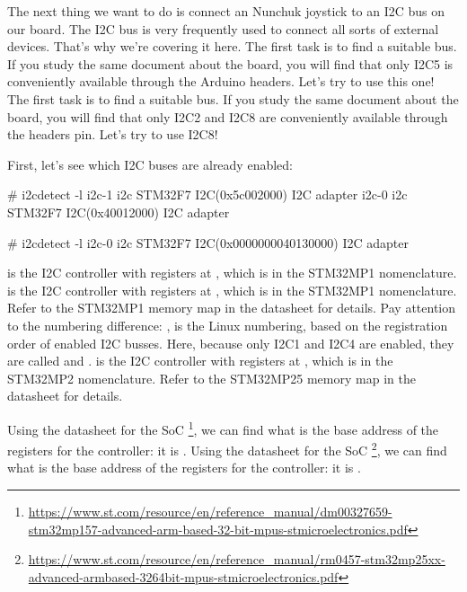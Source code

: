 The next thing we want to do is connect an Nunchuk joystick
to an I2C bus on our board. The I2C bus is very frequently used
to connect all sorts of external devices. That's why we're covering
it here.
\if{}
      The first task is to find a suitable bus. If you study the
      same document about the board, you will find that only I2C5 is
      conveniently available through the Arduino headers. Let's try
      to use this one!
\fi
\if{}
      The first task is to find a suitable bus. If you study the
      same document about the board, you will find that only I2C2 and I2C8 are
      conveniently available through the headers pin. Let's try
      to use I2C8!
\fi

First, let's see which I2C buses are already enabled:

\if{}
      \begin{bashinput}
      # i2cdetect -l
      i2c-1	i2c             STM32F7 I2C(0x5c002000)                 I2C adapter
      i2c-0	i2c             STM32F7 I2C(0x40012000)                 I2C adapter
      \end{bashinput}
\fi
\if{}
      \begin{bashinput}
      # i2cdetect -l
      i2c-0	i2c       	STM32F7 I2C(0x0000000040130000) 	I2C adapter 
      \end{bashinput}
\fi

\if{}
       is the I2C controller with registers at
      , which is  in the STM32MP1
      nomenclature.  is the I2C controller with registers at
      , which is  in the STM32MP1
      nomenclature. Refer to the STM32MP1 memory map in the datasheet for
      details. Pay attention to the numbering difference: ,
       is the Linux numbering, based on the registration order
      of enabled I2C busses. Here, because only I2C1 and I2C4 are enabled,
      they are called  and .
\fi
\if{}
       is the I2C controller with registers at
      , which is  in the STM32MP2
      nomenclature. Refer to the STM32MP25 memory map in the datasheet for
      details.
\fi

\if{}
      Using the datasheet for the SoC
      \footnote{\url{https://www.st.com/resource/en/reference_manual/dm00327659-stm32mp157-advanced-arm-based-32-bit-mpus-stmicroelectronics.pdf}},
      we can find what is the base address of the registers for the
       controller: it is .
\fi
\if{}
      Using the datasheet for the SoC
      \footnote{\url{https://www.st.com/resource/en/reference_manual/rm0457-stm32mp25xx-advanced-armbased-3264bit-mpus-stmicroelectronics.pdf}},
      we can find what is the base address of the registers for the
       controller: it is .
\fi

